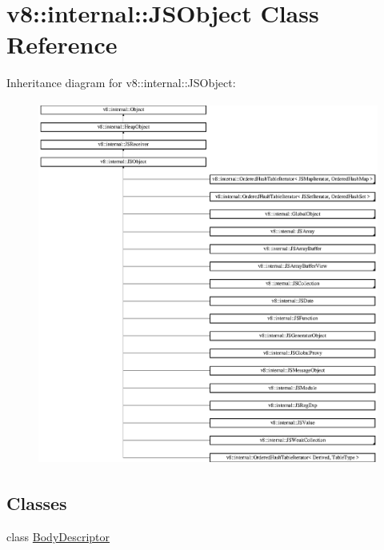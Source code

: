 \hypertarget{classv8_1_1internal_1_1_j_s_object}{}\section{v8\+:\+:internal\+:\+:J\+S\+Object Class Reference}
\label{classv8_1_1internal_1_1_j_s_object}
Inheritance diagram for v8\+:\+:internal\+:\+:J\+S\+Object\+:\begin{figure}[H]
\begin{center}
\leavevmode
\includegraphics[height=12.000000cm]{classv8_1_1internal_1_1_j_s_object}
\end{center}
\end{figure}
\subsection*{Classes}
\begin{DoxyCompactItemize}
\item 
class \hyperlink{classv8_1_1internal_1_1_j_s_object_1_1_body_descriptor}{Body\+Descriptor}
\end{DoxyCompactItemize}
